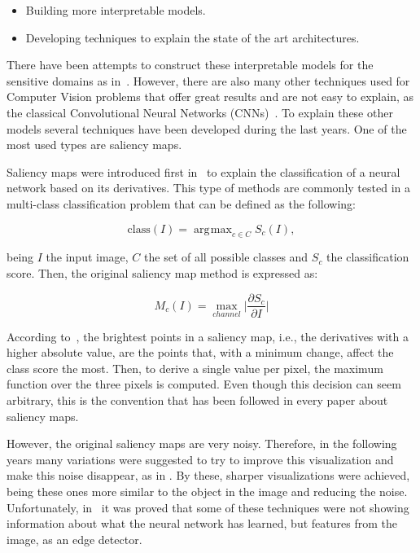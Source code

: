\documentclass[preprint,12pt]{elsarticle}
\DeclareMathOperator*{\argmax}{arg\!max}
\begin{document}
\begin{itemize}
    \item Building more interpretable models.
    \item Developing techniques to explain the state of the art architectures.
\end{itemize}

There have been attempts to construct these interpretable models for the sensitive domains as in~\cite{Singh2022}. However, there are also many other techniques used for Computer Vision problems that offer great results and are not easy to explain, as the classical Convolutional Neural Networks (CNNs)~\cite{LeCun1998}. To explain these other models  several techniques have been developed during the last years. One of the most used types are saliency maps.

Saliency maps were introduced first in~\cite{Simonyan2014} to explain the classification of a neural network based on its derivatives. This type of methods are commonly tested in a multi-class classification problem that can be defined as the following:

\begin{equation}
    \label{eq: cnn output}
    \text{class}(I) = \argmax_{c \in C}S_c(I),
\end{equation}

\noindent
being $I$ the input image, $C$ the set of all possible classes and $S_c$ the classification score. Then, the original saliency map method is expressed as:

\begin{equation}
    \label{eq: saliency map}
    M_c(I) = \max_{channel} \bigg |\frac{\partial S_c}{\partial I} \bigg |
\end{equation}

\noindent
According to~\cite{Simonyan2014}, the brightest points in a saliency map, i.e., the derivatives with a higher absolute value, are the points that, with a minimum change, affect the class score the most. Then, to derive a single value per pixel, the maximum function over the three pixels is computed. Even though this decision can seem arbitrary, this is the convention that has been followed in every paper about saliency maps.

However, the original saliency maps are very noisy. Therefore, in the following years many variations were suggested to try to improve this visualization and make this noise disappear, as in \cite{Springenberg2015, Sundararajan2017, Shrikumar2017}. By these, sharper visualizations were achieved, being these ones more similar to the object in the image and reducing the noise. Unfortunately, in~\cite{Adebayo2018} it was proved that some of these techniques were not showing information about what the neural network has learned, but features from the image, as an edge detector. 
\end{document}
